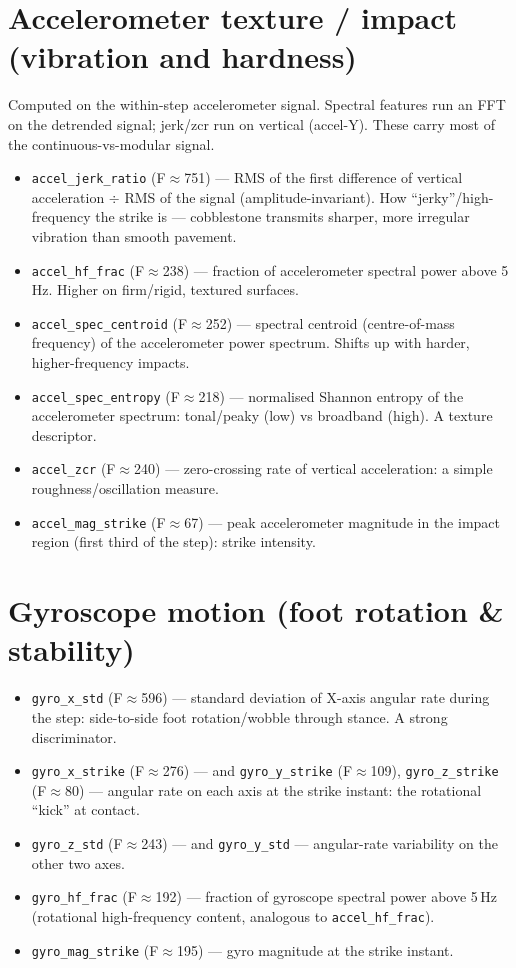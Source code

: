 \documentclass[11pt]{article}
\begin{document}
\section{Accelerometer texture / impact (vibration and hardness)}
Computed on the within-step accelerometer signal. Spectral features run an FFT on the detrended
signal; jerk/zcr run on vertical (accel-Y). These carry most of the continuous-vs-modular signal.
\begin{itemize}
\item \texttt{accel\_jerk\_ratio} (F$\approx$751) --- RMS of the first difference of vertical acceleration $\div$ RMS of the signal (amplitude-invariant). How ``jerky''/high-frequency the strike is --- cobblestone transmits sharper, more irregular vibration than smooth pavement.
\item \texttt{accel\_hf\_frac} (F$\approx$238) --- fraction of accelerometer spectral power above 5\,Hz. Higher on firm/rigid, textured surfaces.
\item \texttt{accel\_spec\_centroid} (F$\approx$252) --- spectral centroid (centre-of-mass frequency) of the accelerometer power spectrum. Shifts up with harder, higher-frequency impacts.
\item \texttt{accel\_spec\_entropy} (F$\approx$218) --- normalised Shannon entropy of the accelerometer spectrum: tonal/peaky (low) vs broadband (high). A texture descriptor.
\item \texttt{accel\_zcr} (F$\approx$240) --- zero-crossing rate of vertical acceleration: a simple roughness/oscillation measure.
\item \texttt{accel\_mag\_strike} (F$\approx$67) --- peak accelerometer magnitude in the impact region (first third of the step): strike intensity.
\end{itemize}

\section{Gyroscope motion (foot rotation \& stability)}
\begin{itemize}
\item \texttt{gyro\_x\_std} (F$\approx$596) --- standard deviation of X-axis angular rate during the step: side-to-side foot rotation/wobble through stance. A strong discriminator.
\item \texttt{gyro\_x\_strike} (F$\approx$276) --- and \texttt{gyro\_y\_strike} (F$\approx$109), \texttt{gyro\_z\_strike} (F$\approx$80) --- angular rate on each axis at the strike instant: the rotational ``kick'' at contact.
\item \texttt{gyro\_z\_std} (F$\approx$243) --- and \texttt{gyro\_y\_std} --- angular-rate variability on the other two axes.
\item \texttt{gyro\_hf\_frac} (F$\approx$192) --- fraction of gyroscope spectral power above 5\,Hz (rotational high-frequency content, analogous to \texttt{accel\_hf\_frac}).
\item \texttt{gyro\_mag\_strike} (F$\approx$195) --- gyro magnitude at the strike instant.
\end{itemize}
\end{document}
